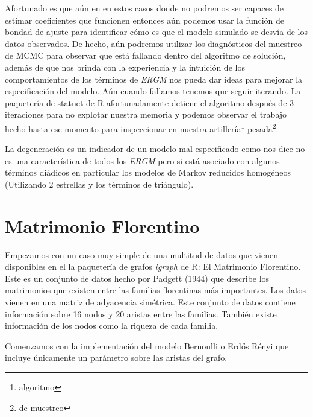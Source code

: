 Afortunado es que aún en en estos casos donde no podremos ser capaces de estimar coeficientes que funcionen entonces aún podemos usar la función de bondad de ajuste para identificar cómo es que el modelo simulado se desvía de los datos observados. De hecho, aún podremos utilizar los diagnósticos del muestreo de MCMC para observar que está fallando dentro del algoritmo de solución, además de que nos brinda con la experiencia y la intuición de los comportamientos de los términos de \textit{ERGM} nos pueda dar ideas para mejorar la especificación del modelo. Aún cuando fallamos tenemos que seguir iterando. La paquetería de statnet de R afortunadamente detiene el algoritmo después de 3 iteraciones para no explotar nuestra memoria y podemos observar el trabajo hecho hasta ese momento para inspeccionar en nuestra artillería\footnote{algoritmo} pesada\footnote{de muestreo}.

La degeneración es un indicador de un modelo mal especificado como nos dice \cite{Snidjers2010} no es una característica de todos los \textit{ERGM} pero si está asociado con algunos términos diádicos en particular los modelos de Markov reducidos homogéneos (Utilizando 2 estrellas y los términos de triángulo).

\section{Matrimonio Florentino}

Empezamos con un caso muy simple de una multitud de datos que vienen disponibles en el la paquetería de grafos \textit{igraph} de R: El Matrimonio Florentino. Este es un conjunto de datos hecho por Padgett (1944) que describe los matrimonios que existen entre las familias florentinas más importantes. Los datos vienen en una matriz de adyacencia simétrica. Este conjunto de datos contiene información sobre 16 nodos y 20 aristas entre las familias. También existe información de los nodos como la riqueza de cada familia.


Comenzamos con la implementación del modelo Bernoulli o Erd\H{o}s Rényi que incluye únicamente un parámetro sobre las aristas del grafo.

